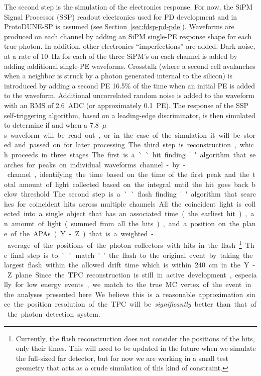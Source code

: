 The second step is the simulation of the electronics response. For now, the SiPM Signal Processor (SSP) readout electronics used for PD development and in ProtoDUNE-SP is assumed (see Section~\ref{sec:fdsp-pd-pde}). 
Waveforms are produced on each channel by adding an SiPM single-PE response shape for each true photon. In addition, other electronics ``imperfections'' are added. Dark noise, at a rate of \SI{10}{Hz} for each of the three SiPM's on each channel is added by adding additional single-PE waveforms. Crosstalk (where a second cell avalanches when a neighbor is struck by a photon generated internal to the silicon) is introduced by adding a second PE \num{16.5}\% of the time when an initial PE is added to the waveform. Additional uncorrelated random noise is added to the waveform with an RMS of \SI{2.6}{ADC} (or approximately \SI{0.1}{PE}). The response of the SSP self-triggering algorithm, based on a leading-edge discriminator, is then simulated to determine if and when a \SI{7.8}{$\mu$s} waveform will be read out, or in the case of the simulation it will be stored and passed on for later processing.

The third step is reconstruction, which proceeds in three stages. The first is a ``hit finding'' algorithm that searches for peaks on individual waveforms channel-by-channel, identifying the time based on the time of the first peak and the total amount of light collected based on the integral until the hit goes back below threshold. The second step is a ``flash finding'' algorithm that searches for coincident hits across multiple channels. All the coincident light is collected into a single object that has an associated time (the earliest hit), an amount of light (summed from all the hits), and a position on the plane of the APAs (Y-Z) that is a weighted-average of the positions of the photon collectors with hits in the flash\footnote{Currently, the flash reconstruction does not consider the positions of the hits, only their times. 
This will need to be updated in the future when we simulate the full-sized far detector, but for now we are working in a small test geometry that acts as a crude simulation of this kind of constraint.}. The final step is to ``match'' the flash to the original event by taking the largest flash within the allowed drift time which is within \SI{240}{cm} in the Y-Z plane. Since the TPC reconstruction is still in active development, especially for low energy events, we match to the true MC vertex of the event in the analyses presented here. We believe this is a reasonable approximation since the position resolution of the TPC will be \emph{significantly} better than that of the photon detection system. 

